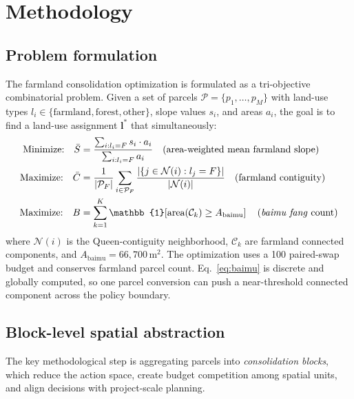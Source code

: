 \documentclass[preprint,12pt]{elsarticle}
\begin{document}
\section{Methodology}
\label{sec:methods}

\subsection{Problem formulation}
\label{sec:problem}

The farmland consolidation optimization is formulated as a tri-objective combinatorial problem. Given a set of parcels $\mathcal{P} = \{p_1, \ldots, p_M\}$ with land-use types $l_i \in \{\text{farmland}, \text{forest}, \text{other}\}$, slope values $s_i$, and areas $a_i$, the goal is to find a land-use assignment $\mathbf{l}^*$ that simultaneously:
\begin{align}
\text{Minimize:} \quad \bar{S} &= \frac{\sum_{i: l_i = F} s_i \cdot a_i}{\sum_{i: l_i = F} a_i} \quad \text{(area-weighted mean farmland slope)} \label{eq:slope} \\
\text{Maximize:} \quad \bar{C} &= \frac{1}{|\mathcal{P}_F|} \sum_{i \in \mathcal{P}_F} \frac{|\{j \in \mathcal{N}(i): l_j = F\}|}{|\mathcal{N}(i)|} \quad \text{(farmland contiguity)} \label{eq:cont} \\
\text{Maximize:} \quad B &= \sum_{k=1}^{K} \mathbb{1}\!\left[\text{area}(\mathcal{C}_k) \geq A_{\text{baimu}}\right] \quad \text{(\textit{baimu fang} count)} \label{eq:baimu}
\end{align}
where $\mathcal{N}(i)$ is the Queen-contiguity neighborhood, $\mathcal{C}_k$ are farmland connected components, and $A_{\text{baimu}}=66{,}700$\,m$^2$. The optimization uses a 100 paired-swap budget and conserves farmland parcel count. Eq.~\ref{eq:baimu} is discrete and globally computed, so one parcel conversion can push a near-threshold connected component across the policy boundary.

\subsection{Block-level spatial abstraction}
\label{sec:blocks}

The key methodological step is aggregating parcels into \textit{consolidation blocks}, which reduce the action space, create budget competition among spatial units, and align decisions with project-scale planning.
\end{document}

